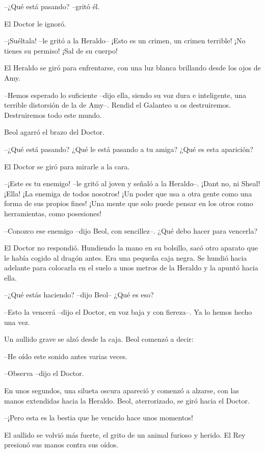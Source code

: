 {--¿Qué está pasando? --gritó él.}

{El Doctor le ignoró.}

{--¡Suéltala! --le gritó a la Heraldo-- ¡Esto es un crimen, un crimen
terrible! ¡No tienes su permiso! ¡Sal de su cuerpo!}

{El Heraldo se giró para enfrentarse, con una luz blanca brillando desde
los ojos de Amy.}

{--Hemos esperado lo suficiente --dijo ella, siendo su voz dura e
	inteligente, una terrible distorsión de la de Amy--. Rendid el Galanteo
u os destruiremos. Destruiremos todo este mundo.}

{Beol agarró el brazo del Doctor.}

{--¿Qué está pasando? ¿Qué le está pasando a tu amiga? ¿Qué es esta
aparición?}

{El Doctor se giró para mirarle a la cara.}

{--¡Este es tu enemigo! --le gritó al joven y señaló a la Heraldo--.
	¡Dant no, ni Sheal! ¡Ella! ¡La enemiga de todos nosotros! ¡Un poder que
	usa a otra gente como una forma de sus propios fines! ¡Una mente que
solo puede pensar en los otros como herramientas, como posesiones!}

{--Conozco ese enemigo --dijo Beol, con sencillez--. ¿Qué debo hacer
para vencerla?}

{El Doctor no respondió. Hundiendo la mano en su bolsillo, sacó otro
	aparato que le había cogido al dragón antes. Era una pequeña caja negra.
	Se hundió hacia adelante para colocarla en el suelo a unos metros de la
Heraldo y la apuntó hacia ella.}

{--¿Qué estás haciendo? --dijo Beol-- ¿Qué es eso?}

{--Esto la vencerá --dijo el Doctor, en voz baja y con fiereza--. Ya
lo hemos hecho una vez.}

{Un aullido grave se alzó desde la caja. Beol comenzó a decir:}

{--He oído este sonido antes varias veces.}

{--Observa --dijo el Doctor.}

{En unos segundos, una silueta oscura apareció y comenzó a alzarse, con
	las manos extendidas hacia la Heraldo. Beol, aterrorizado, se giró hacia
el Doctor.}

{--¡Pero esta es la bestia que he vencido hace unos momentos!}

{El aullido se volvió más fuerte, el grito de un animal furioso y
herido. El Rey presionó sus manos contra sus oídos.}

